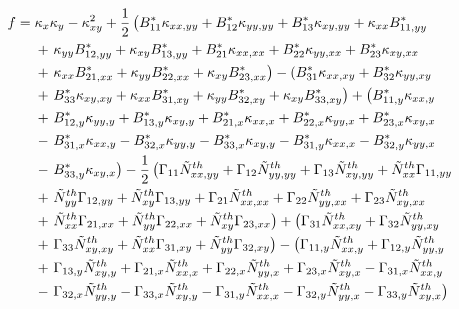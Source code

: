 \documentclass[journal]{new-aiaa}
\begin{document}
\begin{align}
f={}&  
\kappa_x \kappa_y - \kappa_{xy}^2  + \frac{1}{2}\left(B^{\ast}_{11}\kappa_{xx,yy} + B^{*}_{12}\kappa_{yy,yy} + B^{*}_{13}\kappa_{xy,yy}+ \kappa_{xx}B^{*}_{11,yy}\right. \notag\\ 
&+ \left. \kappa_{yy}B^{*}_{12,yy} +  \kappa_{xy}B^{*}_{13,yy} +  B^{*}_{21}\kappa_{xx,xx} + B^{*}_{22}\kappa_{yy,xx} + B^{*}_{23}\kappa_{xy,xx} \right. \notag\\ 
&+ \left. \kappa_{xx}B^{*}_{21,xx} + \kappa_{yy}B^{*}_{22,xx} +  \kappa_{xy}B^{*}_{23,xx}\right) - \left(B^{*}_{31}\kappa_{xx,xy}  +  B^{*}_{32}\kappa_{yy,xy} \right. \notag\\ 
&+ \left.  B^{*}_{33}\kappa_{xy,xy} + \kappa_{xx}B^{*}_{31,xy} + \kappa_{yy}B^{*}_{32,xy}  + \kappa_{xy}B^{*}_{33,xy}\right)
+ \left(B^{\ast}_{11,y}\kappa_{xx,y} \right. \notag\\ 
&+ \left. B^{\ast}_{12,y}\kappa_{yy,y} + B^{\ast}_{13,y}\kappa_{xy,y} + B^{\ast}_{21,x}\kappa_{xx,x} +  B^{\ast}_{22,x}\kappa_{yy,x} + B^{\ast}_{23,x}\kappa_{xy,x} \right. \notag\\ 
&- \left. B^{\ast}_{31,x}\kappa_{xx,y} - B^{\ast}_{32,x}\kappa_{yy,y} - B^{\ast}_{33,x}\kappa_{xy,y} - B^{\ast}_{31,y}\kappa_{xx,x} - B^{\ast}_{32,y}\kappa_{yy,x} \right. \notag\\ 
&- \left. B^{\ast}_{33,y}\kappa_{xy,x}\right)- \frac{1}{2}\left(\Gamma_{11}\tilde{N}^{th}_{xx,yy} + \Gamma_{12}\tilde{N}^{th}_{yy,yy} + \Gamma_{13}\tilde{N}^{th}_{xy,yy} + \tilde{N}^{th}_{xx}\Gamma_{11,yy}\right. \notag\\ &+ \left. \tilde{N}^{th}_{yy}\Gamma_{12,yy} + \tilde{N}^{th}_{xy}\Gamma_{13,yy} +  \Gamma_{21}\tilde{N}^{th}_{xx,xx} +\Gamma_{22}\tilde{N}^{th}_{yy,xx} + \Gamma_{23}\tilde{N}^{th}_{xy,xx} \right. \notag\\ 
&+ \left.\tilde{N}^{th}_{xx}\Gamma_{21,xx} + \tilde{N}^{th}_{yy}\Gamma_{22,xx} +  \tilde{N}^{th}_{xy}\Gamma_{23,xx}\right) + \left(\Gamma_{31}\tilde{N}^{th}_{xx,xy} + \Gamma_{32}\tilde{N}^{th}_{yy,xy}  \right. \notag\\ 
&+ \left. \Gamma_{33}\tilde{N}^{th}_{xy,xy} + \tilde{N}^{th}_{xx}\Gamma_{31,xy} + \tilde{N}^{th}_{yy}\Gamma_{32,xy} \right)
- \left(\Gamma_{11,y}\tilde{N}^{th}_{xx,y} + \Gamma_{12,y}\tilde{N}^{th}_{yy,y} \right. \notag\\ 
&+ \left. \Gamma_{13,y}\tilde{N}^{th}_{xy,y} +\Gamma_{21,x}\tilde{N}^{th}_{xx,x} +  \Gamma_{22,x}\tilde{N}^{th}_{yy,x} + \Gamma_{23,x}\tilde{N}^{th}_{xy,x} -\Gamma_{31,x}\tilde{N}^{th}_{xx,y} \right. \notag\\ 
&- \left. \Gamma_{32,x}\tilde{N}^{th}_{yy,y} - \Gamma_{33,x}\tilde{N}^{th}_{xy,y} - \Gamma_{31,y}\tilde{N}^{th}_{xx,x} - \Gamma_{32,y}\tilde{N}^{th}_{yy,x} - \Gamma_{33,y}\tilde{N}^{th}_{xy,x}\right) \notag\\ 
\end{align}
\end{document}
